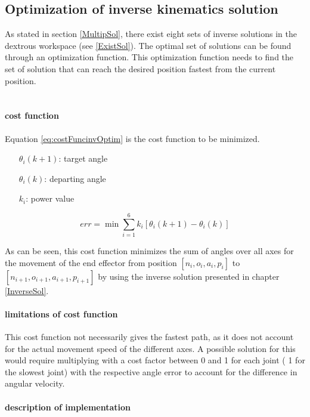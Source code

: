 \subsection{Optimization of inverse kinematics solution}

As stated in section \ref{MultipSol}, there exist eight sets of inverse solutions in the dextrous workspace (see \ref{ExistSol}).
The optimal set of solutions can be found through an optimization function. 
This optimization function needs to find the set of solution that can reach the desired position fastest from the current position.\\
\\
\paragraph{cost function}
Equation \ref{eq:costFuncinvOptim} is the cost function to be minimized.
\begin{itemize}[wide=\parindent] 
	\item[$\theta_i (k+1)$:] target angle
	\item[$\theta_i(k)$:] departing angle
	\item[$k_i$:] power value
\end{itemize}

\begin{equation}\label{eq:costFuncinvOptim}
	err =  \min\sum_{i=1}^{6} k_i [\theta_i (k+1) - \theta_i(k)] 
\end{equation}

As can be seen, this cost function minimizes the sum of angles over all axes for the movement of the end effector from position $[n_i,o_i,a_i,p_i ]$ to $[n_{i+1}, o_{i+1}, a_{i+1}, p_{i+1}]$ by using the inverse solution presented in chapter \ref{InverseSol}.

\paragraph{limitations of cost function}
This cost function not necessarily gives the fastest path, as it does not account for the actual movement speed of the different axes. 
A possible solution for this would require multiplying with a cost factor between 0 and 1 for each joint ( 1 for the slowest joint) with the respective angle error to account for the difference in angular velocity.



\paragraph{description of implementation}

